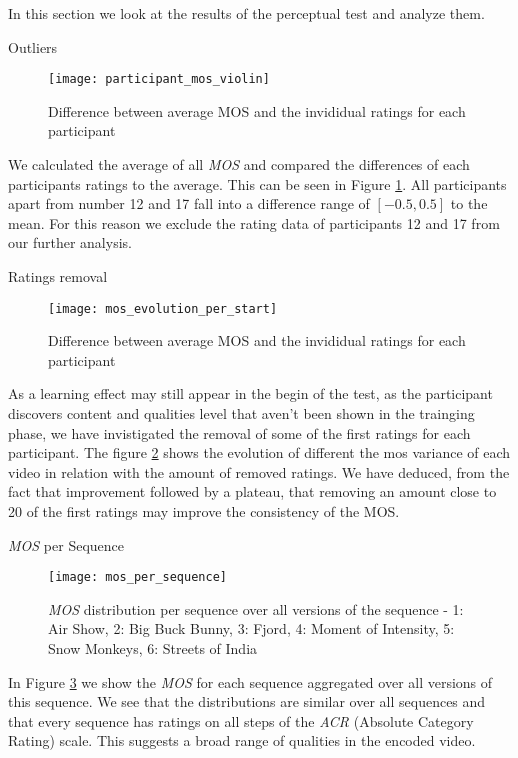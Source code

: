 In this section we look at the results of the perceptual test and analyze them.

\large{Outliers}
\begin{figure}
	\centering
	\texttt{[image: participant\_mos\_violin]}
	\caption{Difference between average MOS and the invididual ratings for each participant}
	\label{fig:result:participant_violin}
\end{figure}

We calculated the average of all \textit{MOS} and compared the differences of each participants ratings to the average. This can be seen in Figure \ref{fig:result:participant_violin}. All participants apart from number 12 and 17 fall into a difference range of $[-0.5, 0.5]$ to the mean. For this reason we exclude the rating data of participants 12 and 17 from our further analysis.


\large{Ratings removal}
\begin{figure}
	\centering
	\texttt{[image: mos\_evolution\_per\_start]}
	\caption{Difference between average MOS and the invididual ratings for each participant}
	\label{fig:result:mos_evolution_per_start}
\end{figure}

As a learning effect may still appear in the begin of the test, as the participant discovers content and qualities level that aven't been shown in the trainging phase, we have invistigated the removal of some of the first ratings for each participant. The figure \ref{fig:result:mos_evolution_per_start} shows the evolution of different the mos variance of each video in relation with the amount of removed ratings.
We have deduced, from the fact that improvement followed by a plateau, that removing an amount close to 20 of the first ratings may improve the consistency of the MOS.



\large{\textit{MOS} per Sequence}
\begin{figure}
	\centering
	\texttt{[image: mos\_per\_sequence]}
	\caption{\textit{MOS} distribution per sequence over all versions of the sequence - 1: Air Show, 2: Big Buck Bunny, 3: Fjord, 4: Moment of Intensity, 5: Snow Monkeys, 6: Streets of India}
	\label{fig:result:mos_per_sequence}
\end{figure}

In Figure \ref{fig:result:mos_per_sequence} we show the \textit{MOS} for each sequence aggregated over all versions of this sequence. We see that the distributions are similar over all sequences and that every sequence has ratings on all steps of the \textit{ACR} (Absolute Category Rating) scale. This suggests a broad range of qualities in the encoded video.




